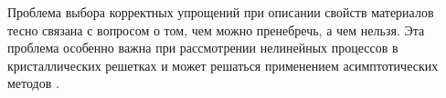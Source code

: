 Проблема выбора корректных упрощений при описании свойств материалов тесно связана с вопросом о том, чем можно пренебречь, а чем нельзя. Эта проблема особенно важна при рассмотрении нелинейных процессов в кристаллических решетках и может решаться применением асимптотических методов \cite{Maug, Zabus, engbook83, Manev, Zab, engber, PorBer, PorBer2, porkros, porosmich2}.

